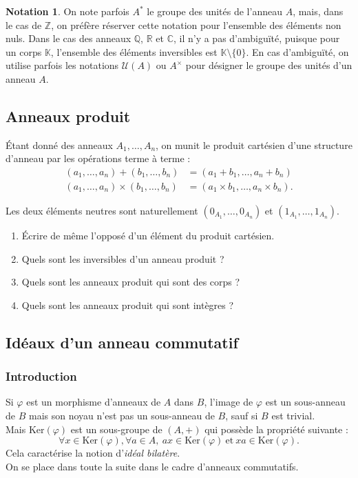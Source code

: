 \documentclass[french]{article}
\newcommand{\Z}{\mathbb{Z}}
\newcommand{\Q}{\mathbb{Q}}
\newcommand{\R}{\mathbb{R}}
\newcommand{\C}{\mathbb{C}}
\newcommand{\K}{\mathbb{K}}
\newcommand{\st}{^*}
\renewcommand{\ker}{\text{Ker}}
\theoremstyle{plain}
\theoremstyle{definition}
\newtheorem*{notation}{Notation}
\theoremstyle{remark}
\begin{document}
\begin{notation}
	On note parfois $A\st$ le groupe des unités de l'anneau $A$, mais, dans le cas de $\Z$, on préfère réserver cette notation pour l'ensemble des éléments non nuls. Dans le cas des anneaux $\Q$, $\R$ et $\C$, il n'y a pas d'ambiguïté, puisque pour un corps $\K$, l'ensemble des éléments inversibles est $\K\setminus\{0\}$. En cas d'ambiguïté, on utilise parfois les notations $\mathcal{U}(A)$ ou $A^\times$ pour désigner le groupe des unités d'un anneau $A$.
\end{notation}


\subsection{Anneaux produit}

Étant donné des anneaux $A_1,\ldots,A_n$, on munit le produit cartésien d'une structure d'anneau par les opérations terme à terme :
\begin{align*}
	(a_1,\ldots,a_n)+(b_1,\ldots,b_n)&=(a_1+b_1,\ldots,a_n+b_n)\\
	(a_1,\ldots,a_n)\times(b_1,\ldots,b_n)&=(a_1\times b_1,\ldots,a_n\times b_n).
\end{align*}

Les deux éléments neutres sont naturellement $(0_{A_1},\ldots,0_{A_n})$ et $(1_{A_1},\ldots,1_{A_n})$.

\begin{exo}
	\begin{enumerate}
		\item Écrire de même l'opposé d'un élément du produit cartésien.
		\item Quels sont les inversibles d'un anneau produit ?
		\item Quels sont les anneaux produit qui sont des corps ?
		\item Quels sont les anneaux produit qui sont intègres ?
	\end{enumerate}
\end{exo}

\subsection{Idéaux d'un anneau commutatif}

\subsubsection*{Introduction}

Si $\varphi$ est un morphisme d'anneaux de $A$ dans $B$, l'image de $\varphi$ est un sous-anneau de $B$ mais son noyau n'est pas un sous-anneau de $B$, sauf si $B$ est trivial.\\
Mais $\ker(\varphi)$ est un sous-groupe de $(A,+)$ qui possède la propriété suivante :
$$\forall x\in\ker(\varphi),\forall a\in A,\ ax\in\ker(\varphi)\ \text{et}\ xa\in\ker(\varphi).$$
Cela caractérise la notion d'\textit{idéal bilatère}.\\
On se place dans toute la suite dans le cadre d'anneaux commutatifs.
\end{document}
